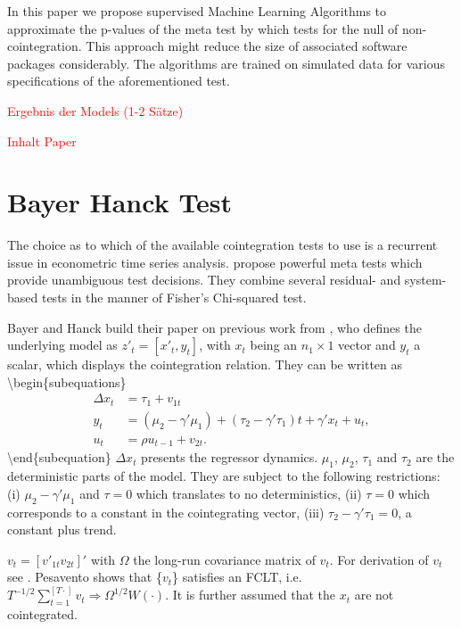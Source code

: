 \documentclass[12pt,a4paper]{article}
\begin{document}
In this paper we propose supervised Machine Learning Algorithms to
approximate the p-values of the meta test by \textcite{Bayerhanck_2012}
which tests for the null of non-cointegration. This approach might
reduce the size of associated software packages considerably. The
algorithms are trained on simulated data for various specifications of
the aforementioned test.

\textcolor{red}{Ergebnis der Models (1-2 Sätze)}

\textcolor{red}{Inhalt Paper}

\hypertarget{bayer-hanck-test}{%
\section{Bayer Hanck Test}\label{bayer-hanck-test}}

The choice as to which of the available cointegration tests to use is a
recurrent issue in econometric time series analysis.
\textcite{Bayerhanck_2012} propose powerful meta tests which provide
unambiguous test decisions. They combine several residual- and
system-based tests in the manner of Fisher's \autocite*{Fisher_1932}
Chi-squared test.

Bayer and Hanck build their paper on previous work from
\textcite{Pesavento_2004}, who defines the underlying model as
\(z'_t = [x'_t, y_t]\), with \(x_t\) being an \(n_1 \times 1\) vector
and \(y_t\) a scalar, which displays the cointegration relation. They
can be written as \textbackslash begin\{subequations\} \label{eq:1}
\begin{align}
\Delta x_t &= \tau_1 + v_{1t} \label{eq:11} \\
y_t &= (\mu_2 - \gamma' \mu_1) + (\tau_2 - \gamma' \tau_1) t + \gamma' x_t + u_t, \label{eq:12} \\
u_t &= \rho u_{t-1} + v_{2t}. \label{eq:13}
\end{align} \textbackslash end\{subequation\} \(\Delta x_t\) presents
the regressor dynamics. \(\mu_1\), \(\mu_2\), \(\tau_1\) and \(\tau_2\)
are the deterministic parts of the model. They are subject to the
following restrictions: (i) \(\mu_2 - \gamma' \mu_1\) and \(\tau = 0\)
which translates to no deterministics, (ii) \(\tau = 0\) which
corresponds to a constant in the cointegrating vector, (iii)
\(\tau_2 - \gamma' \tau_1 = 0\), a constant plus trend.

\(v_t = [v'_{1t} v_{2t}]'\) with \(\Omega\) the long-run covariance
matrix of \(v_t\). For derivation of \(v_t\) see
\textcite{Pesavento_2004}. Pesavento shows that \{\(v_t\)\} satisfies an
FCLT,
i.e.~\(T^{-1/2} \sum^{[T \cdot]}_{t=1} v_t \Rightarrow \Omega^{1/2} W(\cdot)\).
It is further assumed that the \(x_t\) are not cointegrated.
\end{document}
